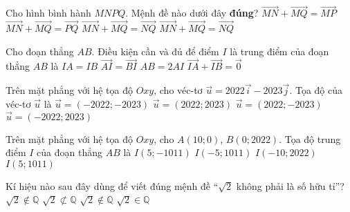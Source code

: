 \begin{ex}%
	Cho hình bình hành $MNPQ$. Mệnh đề nào dưới đây \textbf{đúng}?
	\choice
	{\True $\vec{MN}+\vec{MQ}=\vec{MP}$}
	{$\vec{MN}+\vec{MQ}=\vec{PQ}$}
	{$\vec{MN}+\vec{MQ}=\vec{NQ}$}
	{$\vec{MN}+\vec{MQ}=\vec{NQ}$}
\end{ex}
\begin{ex}%
	Cho đoạn thẳng $AB$. Điều kiện cần và đủ để điểm $I$ là trung điểm của đoạn thẳng $AB$ là
	\choice
	{$IA=IB$}
	{$\vec{AI}=\vec{BI}$}
	{$AB=2AI$}
	{\True $\vec{IA}+\vec{IB}=\vec{0}$}
\end{ex}

\begin{ex}%
	Trên mặt phẳng với hệ tọa độ $Oxy$, cho véc-tơ $\vec{u}=2022\vec{i}-2023\vec{j}$. Tọa độ của véc-tơ $\vec{u}$ là
	\choice
	{$\vec{u}=(-2022;-2023)$}
	{$\vec{u}=(2022;2023)$}
	{\True $\vec{u}=(2022;-2023)$}
	{$\vec{u}=(-2022;2023)$}
\end{ex}

\begin{ex}%
	Trên mặt phẳng với hệ tọa độ $Oxy$, cho $A(10;0)$, $B(0;2022)$. Tọa độ trung điểm $I$ của đoạn thẳng $AB$ là
	\choice
	{$I(5;-1011)$}
	{$I(-5;1011)$}
	{$I(-10;2022)$}
	{\True $I(5;1011)$}
\end{ex}
\begin{ex}%
	Kí hiệu nào sau đây dùng để viết đúng mệnh đề ``$\sqrt{2}$ không phải là số hữu tỉ''?
	\choice
	{$\sqrt{2}\notin \mathbb{Q}$}
	{$\sqrt{2}\not\subset\mathbb{Q}$}
	{\True $\sqrt{2}\notin\mathbb{Q}$}
	{$\sqrt{2}\in\mathbb{Q}$}
\end{ex}

